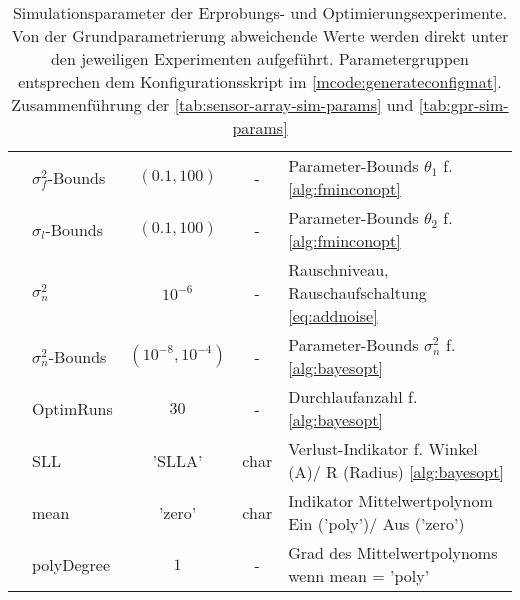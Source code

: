 \begin{table}[htp]
{\begin{tabular}{l l c c l}
			                                         & $\sigma_f^2$-Bounds & $(0.1, 100)$         & -                 & Parameter-Bounds $\theta_1$ f. \autoref{alg:fminconopt}             \\
			                                         & $\sigma_l$-Bounds   & $(0.1, 100)$         & -                 & Parameter-Bounds $\theta_2$ f. \autoref{alg:fminconopt}             \\
			                                         & $\sigma_n^2$        & $10^{-6}$            & -                 & Rauschniveau, Rauschaufschaltung \eqref{eq:addnoise}                \\
			                                         & $\sigma_n^2$-Bounds & $(10^{-8}, 10^{-4})$ & -                 & Parameter-Bounds $\sigma_n^2$ f. \autoref{alg:bayesopt}             \\
			                                         & OptimRuns           & $30$                 & -                 & Durchlaufanzahl f. \autoref{alg:bayesopt}                           \\
			                                         & SLL                 & 'SLLA'               & char              & Verlust-Indikator f. Winkel (A)/ R (Radius) \autoref{alg:bayesopt}  \\
			                                         & mean                & 'zero'               & char              & Indikator Mittelwertpolynom Ein ('poly')/ Aus ('zero')              \\
			                                         & polyDegree          & $1$                  & -                 & Grad des Mittelwertpolynoms wenn mean = 'poly'                      \\ \bottomrule
		\end{tabular}}
	\caption[Simulationsparameter der Erprobungs- und Optimierungsexperimente]{Simulationsparameter der Erprobungs- und Optimierungsexperimente. Von der Grundparametrierung abweichende Werte werden direkt unter den jeweiligen Experimenten aufgeführt. Parametergruppen entsprechen dem Konfigurationsskript im \autoref{mcode:generateconfigmat}. Zusammenführung der \autoref{tab:sensor-array-sim-params} und \autoref{tab:gpr-sim-params}}
	\label{tab:sim-params-exp}
\end{table}



	





